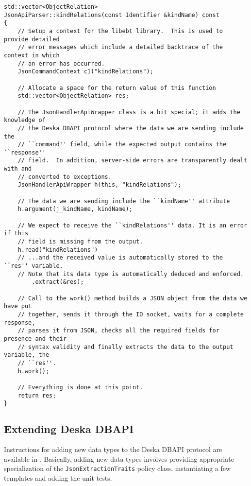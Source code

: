 \documentclass[deska]{subfiles}
\begin{document}
\begin{verbatim}
std::vector<ObjectRelation>
JsonApiParser::kindRelations(const Identifier &kindName) const
{
    // Setup a context for the libebt library.  This is used to provide detailed
    // error messages which include a detailed backtrace of the context in which
    // an error has occurred.
    JsonCommandContext c1("kindRelations");

    // Allocate a space for the return value of this function
    std::vector<ObjectRelation> res;

    // The JsonHandlerApiWrapper class is a bit special; it adds the knowledge of
    // the Deska DBAPI protocol where the data we are sending include the
    // ``command'' field, while the expected output contains the ``response''
    // field.  In addition, server-side errors are transparently dealt with and
    // converted to exceptions.
    JsonHandlerApiWrapper h(this, "kindRelations");

    // The data we are sending include the ``kindName'' attribute
    h.argument(j_kindName, kindName);

    // We expect to receive the ``kindRelations'' data. It is an error if this
    // field is missing from the output.
    h.read("kindRelations")
    // ...and the received value is automatically stored to the ``res'' variable.
    // Note that its data type is automatically deduced and enforced.
        .extract(&res);

    // Call to the work() method builds a JSON object from the data we have put
    // together, sends it through the IO socket, waits for a complete response,
    // parses it from JSON, checks all the required fields for presence and their
    // syntax validity and finally extracts the data to the output variable, the
    // ``res''.
    h.work();

    // Everything is done at this point.
    return res;
}
\end{verbatim}

\subsection{Extending Deska DBAPI}

Instructions for adding new data types to the Deska DBAPI protocol are available in .
Basically, adding new data types involves providing appropriate specialization of the {\tt JsonExtractionTraits} policy
class, instantiating a few templates and adding the unit tests.
\end{document}
